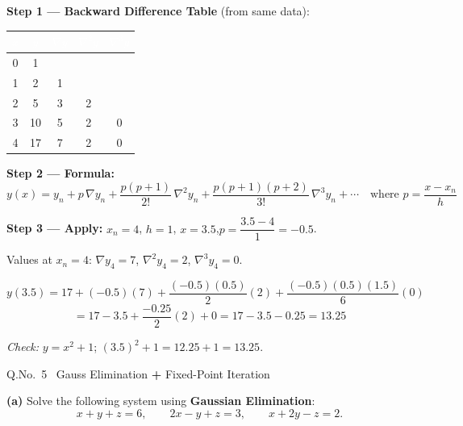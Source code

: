 \documentclass[12pt]{article}
\begin{document}
\begin{ansbox}
\textbf{Step 1 — Backward Difference Table} (from same data):

\begin{center}
\begin{tabular}{|c|c|c|c|c|}
\hline
\rowcolor{primary!80}
\textcolor{white}{\textbf{$x$}} & \textcolor{white}{\textbf{$y$}} & \textcolor{white}{\textbf{$\nabla y$}} & \textcolor{white}{\textbf{$\nabla^2 y$}} & \textcolor{white}{\textbf{$\nabla^3 y$}}\\
\hline
0 & 1 & & &\\\hline
1 & 2 & 1 & &\\\hline
2 & 5 & 3 & 2 &\\\hline
3 & 10 & 5 & 2 & 0\\\hline
4 & 17 & 7 & 2 & 0\\\hline
\end{tabular}
\end{center}

\textbf{Step 2 — Formula:}
\[
  y(x) = y_n + p\,\nabla y_n + \frac{p(p+1)}{2!}\,\nabla^2 y_n + \frac{p(p+1)(p+2)}{3!}\,\nabla^3 y_n + \cdots
  \quad\text{where } p = \frac{x - x_n}{h}
\]

\textbf{Step 3 — Apply:} $x_n = 4$, $h=1$, $x=3.5$,\quad $p = \dfrac{3.5-4}{1} = -0.5$.

Values at $x_n=4$: $\nabla y_4 = 7$,\; $\nabla^2 y_4 = 2$,\; $\nabla^3 y_4 = 0$.

\[
  y(3.5) = 17 + (-0.5)(7) + \frac{(-0.5)(0.5)}{2}(2) + \frac{(-0.5)(0.5)(1.5)}{6}(0)
\]
\[
  = 17 - 3.5 + \frac{-0.25}{2}(2) + 0 = 17 - 3.5 - 0.25 = \boxed{\mathbf{13.25}}
\]

\textit{Check:} $y = x^2+1$;\; $(3.5)^2+1 = 12.25+1 = 13.25$.\;\checkmark
\end{ansbox}

\newpage

\begin{qbox}{Q.No.\ 5 \textemdash\ Gauss Elimination \textbf{+} Fixed-Point Iteration}
\end{qbox}

\medskip
\textbf{(a)} Solve the following system using \textbf{Gaussian Elimination}:
\[
  x + y + z = 6,\qquad 2x - y + z = 3,\qquad x + 2y - z = 2.
\]
\end{document}
